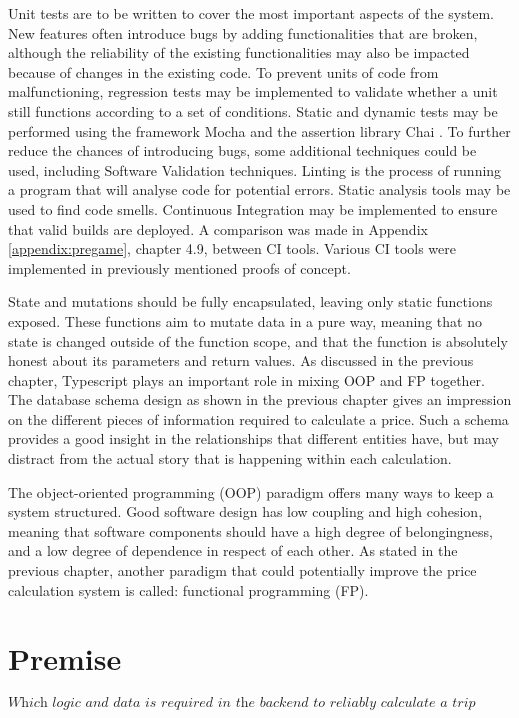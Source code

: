 Unit tests are to be written to cover the most important aspects of the system. New features often introduce bugs by adding functionalities that are broken, although the reliability of the existing functionalities may also be impacted because of changes in the existing code. To prevent units of code from malfunctioning, regression tests may be implemented to validate whether a unit still functions according to a set of conditions. Static and dynamic tests may be performed using the framework Mocha \cite{mocha} and the assertion library Chai \cite{chai}. To further reduce the chances of introducing bugs, some additional techniques could be used, including Software Validation techniques. Linting is the process of running a program that will analyse code for potential errors. Static analysis tools may be used to find code smells. Continuous Integration may be implemented to ensure that valid builds are deployed. A comparison was made in Appendix \ref{appendix:pregame}, chapter 4.9, between CI tools. Various CI tools were implemented in previously mentioned proofs of concept.

State and mutations should be fully encapsulated, leaving only static functions exposed. These functions aim to mutate data in a pure way, meaning that no state is changed outside of the function scope, and that the function is absolutely honest about its parameters and return values. As discussed in the previous chapter, Typescript plays an important role in mixing OOP and FP together. The database schema design as shown in the previous chapter gives an impression on the different pieces of information required to calculate a price. Such a schema provides a good insight in the relationships that different entities have, but may distract from the actual story that is happening within each calculation.

The object-oriented programming (OOP) paradigm offers many ways to keep a system structured. Good software design has low coupling and high cohesion, meaning that software components should have a high degree of belongingness, and a low degree of dependence in respect of each other. As stated in the previous chapter, another paradigm that could potentially improve the price calculation system is called: functional programming (FP).


\section{Premise}
\[\textit{Which logic and data is required in the backend to reliably calculate a trip price?}\]\hfill

